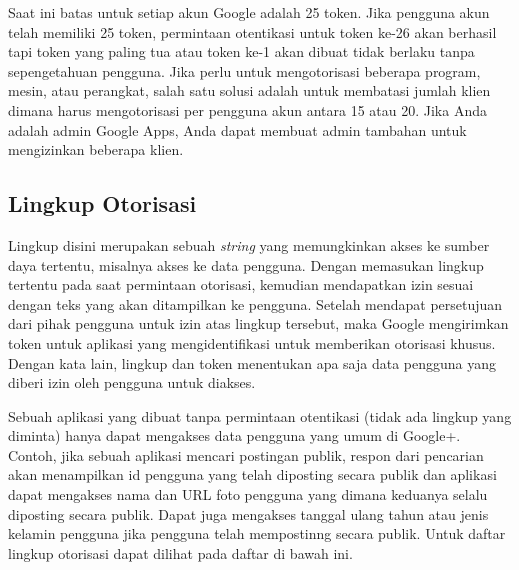 Saat ini batas untuk setiap akun Google adalah 25 token. Jika pengguna akun
telah memiliki 25 token, permintaan otentikasi untuk token ke-26 akan berhasil
tapi token yang paling tua atau token ke-1 akan dibuat tidak berlaku tanpa
sepengetahuan pengguna. Jika perlu untuk mengotorisasi beberapa program, mesin,
atau perangkat, salah satu solusi adalah untuk membatasi jumlah klien dimana
harus mengotorisasi per pengguna akun antara 15 atau 20. Jika Anda adalah admin
Google Apps, Anda dapat membuat admin tambahan untuk mengizinkan beberapa klien.

\subsection{Lingkup Otorisasi \cite{Scope:2013}}
Lingkup disini merupakan sebuah {\it string} yang memungkinkan akses ke sumber
daya tertentu, misalnya akses ke data pengguna. Dengan memasukan lingkup tertentu
pada saat permintaan otorisasi, kemudian mendapatkan izin sesuai dengan teks
yang akan ditampilkan ke pengguna. Setelah mendapat persetujuan dari pihak
pengguna untuk izin atas lingkup tersebut, maka Google mengirimkan token untuk
aplikasi yang mengidentifikasi untuk memberikan otorisasi khusus. Dengan kata
lain, lingkup dan token menentukan apa saja data pengguna yang diberi izin oleh
pengguna untuk diakses.

Sebuah aplikasi yang dibuat tanpa permintaan otentikasi (tidak ada lingkup yang
diminta) hanya dapat mengakses data pengguna yang umum di Google+. Contoh, jika
sebuah aplikasi mencari postingan publik, respon dari pencarian akan menampilkan
id pengguna yang telah diposting secara publik dan aplikasi dapat mengakses nama
dan URL foto pengguna yang dimana keduanya selalu diposting secara publik. Dapat
juga mengakses tanggal ulang tahun atau jenis kelamin pengguna jika pengguna
telah mempostinng secara publik. Untuk daftar lingkup otorisasi dapat dilihat
pada daftar di bawah ini.

